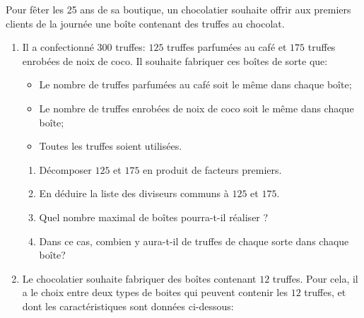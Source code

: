 \documentclass[exercice,a4]{thedocument}%
\begin{document}
%

\medskip

Pour fêter les 25 ans de sa boutique, un chocolatier souhaite offrir aux premiers clients de la journée une boîte contenant des truffes au chocolat.

\medskip

\begin{enumerate}
\item Il a confectionné $300$ truffes: $125$ truffes parfumées au café et $175$ truffes enrobées de noix de coco. Il souhaite fabriquer ces boîtes de sorte que:

\setlength\parindent{1cm}
\begin{itemize}
\item[$\bullet~~$] Le nombre de truffes parfumées au café soit le même dans chaque boîte;
\item[$\bullet~~$] Le nombre de truffes enrobées de noix de coco soit le même dans chaque boîte;
\item[$\bullet~~$] Toutes les truffes soient utilisées.
\end{itemize}
\setlength\parindent{0cm}

	\begin{enumerate}
		\item Décomposer $125$ et $175$ en produit de facteurs premiers.
		\item En déduire la liste des diviseurs communs à $125$ et $175$.
		\item Quel nombre maximal de boîtes pourra-t-il réaliser ?
		\item Dans ce cas, combien y aura-t-il de truffes de chaque sorte dans chaque boîte?
	\end{enumerate}
\item Le chocolatier souhaite fabriquer des boîtes contenant $12$ truffes. Pour cela, il a le choix entre deux types de boites qui peuvent contenir les $12$ truffes, et dont les caractéristiques sont données ci-dessous:


\end{enumerate}
\end{document}
